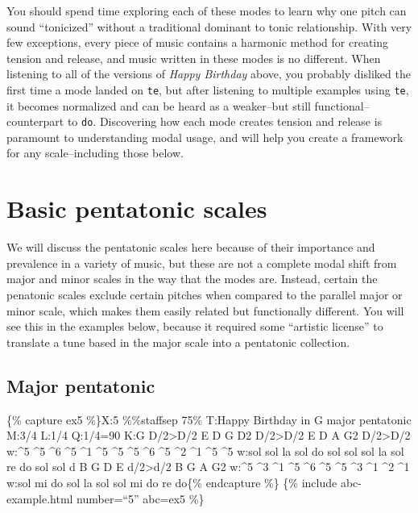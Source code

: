 \documentclass{book}
\begin{document}
You should spend time exploring each of these modes to learn why one pitch can
sound ``tonicized'' without a traditional dominant to tonic relationship. With
very few exceptions, every piece of music contains a harmonic method for
creating tension and release, and music written in these modes is no
different. When listening to all of the versions of \emph{Happy Birthday}
above, you probably disliked the first time a mode landed on \texttt{te}, but
after listening to multiple examples using \texttt{te}, it becomes normalized
and can be heard as a weaker--but still functional--counterpart to
\texttt{do}. Discovering how each mode creates tension and release is
paramount to understanding modal usage, and will help you create a framework
for any scale--including those below.

\hypertarget{basic-pentatonic-scales}{%
\section{Basic pentatonic scales}\label{basic-pentatonic-scales}}

We will discuss the pentatonic scales here because of their importance and
prevalence in a variety of music, but these are not a complete modal shift
from major and minor scales in the way that the modes are. Instead, certain
the penatonic scales exclude certain pitches when compared to the parallel
major or minor scale, which makes them easily related but functionally
different. You will see this in the examples below, because it required some
``artistic license'' to translate a tune based in the major scale into a
pentatonic collection.

\hypertarget{major-pentatonic}{%
\subsection{Major pentatonic}\label{major-pentatonic}}

\{\% capture ex5 \%\}X:5 \%\%staffsep 75\% T:Happy Birthday in G major
pentatonic M:3/4 L:1/4 Q:1/4=90 K:G D/2\textgreater D/2\textbar{} E D
G\textbar{} D2 D/2\textgreater D/2\textbar{} E D A\textbar{} G2
D/2\textgreater D/2\textbar{} w:\^{}5 \^{}5 \^{}6 \^{}5 \^{}1 \^{}5 \^{}5
\^{}5 \^{}6 \^{}5 \^{}2 \^{}1 \^{}5 \^{}5 w:sol sol la sol do sol sol sol la
sol re do sol sol d B G\textbar{} D E d/2\textgreater d/2\textbar{} B G
A\textbar{} G2\textbar{]} w:\^{}5 \^{}3 \^{}1 \^{}5 \^{}6 \^{}5 \^{}5 \^{}3
\^{}1 \^{}2 \^{}1 w:sol mi do sol la sol sol mi do re do\{\% endcapture \%\}
\{\% include abc-example.html number=``5'' abc=ex5 \%\}
\end{document}
